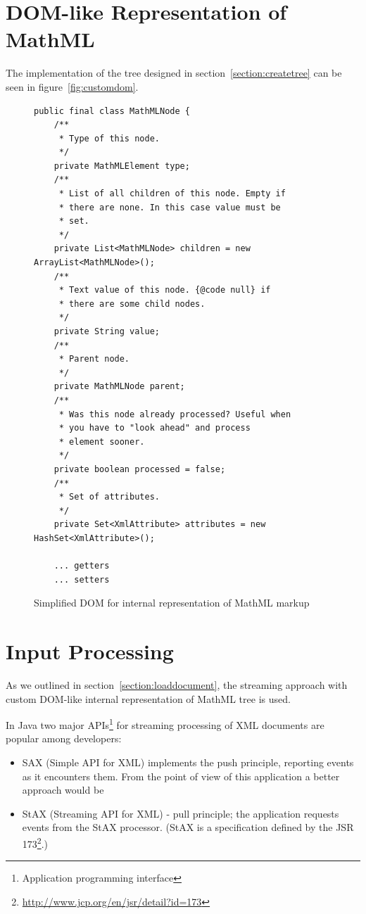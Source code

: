 \documentclass[11pt,oneside,final]{fithesis2}
\begin{document}
\section{DOM-like Representation of MathML}
The implementation of the tree designed in section~\vref{section:createtree} can be seen in figure~\vref{fig:customdom}.

\begin{figure}[!ht]
\begin{lstlisting}
public final class MathMLNode {
    /**
     * Type of this node.
     */
    private MathMLElement type;
    /**
     * List of all children of this node. Empty if 
     * there are none. In this case value must be 
     * set.
     */
    private List<MathMLNode> children = new ArrayList<MathMLNode>();
    /**
     * Text value of this node. {@code null} if 
     * there are some child nodes.
     */
    private String value;
    /**
     * Parent node.
     */
    private MathMLNode parent;
    /**
     * Was this node already processed? Useful when 
     * you have to "look ahead" and process
     * element sooner.
     */
    private boolean processed = false;
    /**
     * Set of attributes.
     */
    private Set<XmlAttribute> attributes = new HashSet<XmlAttribute>();
    
    ... getters
    ... setters
\end{lstlisting}
\caption{Simplified DOM for internal representation of MathML markup}
\label{fig:customdom}
\end{figure}

\section{Input Processing}
As we outlined in section~\vref{section:loaddocument}, the streaming approach with custom DOM-like internal representation of MathML tree is used. 

In Java two major APIs\footnote{Application programming interface} for streaming processing of XML documents are popular among developers:
\begin{itemize}
\item SAX (Simple API for XML) implements the push principle, reporting events as it encounters them. From the point of view of this application a better approach would be
\item StAX (Streaming API for XML) - pull principle; the application requests events from the StAX processor. (StAX is a specification defined by the JSR 173\footnote{\url{http://www.jcp.org/en/jsr/detail?id=173}}.)
\end{itemize}
\end{document}
